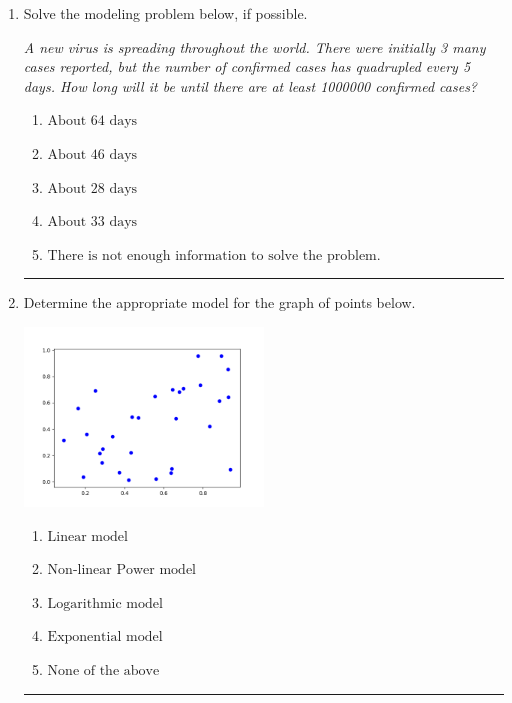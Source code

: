 \documentclass[14pt]{extbook}
\newcommand{\litem}[1]{\item#1\hspace*{-1cm}\rule{\textwidth}{0.4pt}}
\begin{document}
\begin{enumerate}
\litem{
Solve the modeling problem below, if possible.
\begin{center}
    \textit{ A new virus is spreading throughout the world. There were initially 3 many cases reported, but the number of confirmed cases has quadrupled every 5 days. How long will it be until there are at least 1000000 confirmed cases? }
\end{center}
\begin{enumerate}[label=\Alph*.]
\item \( \text{About } 64 \text{ days} \)
\item \( \text{About } 46 \text{ days} \)
\item \( \text{About } 28 \text{ days} \)
\item \( \text{About } 33 \text{ days} \)
\item \( \text{There is not enough information to solve the problem.} \)

\end{enumerate} }
\litem{
Determine the appropriate model for the graph of points below.
\begin{center}
    \includegraphics[width=0.5\textwidth]{../Figures/identifyModelGraph12CopyB.png}
\end{center}
\begin{enumerate}[label=\Alph*.]
\item \( \text{Linear model} \)
\item \( \text{Non-linear Power model} \)
\item \( \text{Logarithmic model} \)
\item \( \text{Exponential model} \)
\item \( \text{None of the above} \)


\end{enumerate}}
\end{enumerate}
\end{document}
